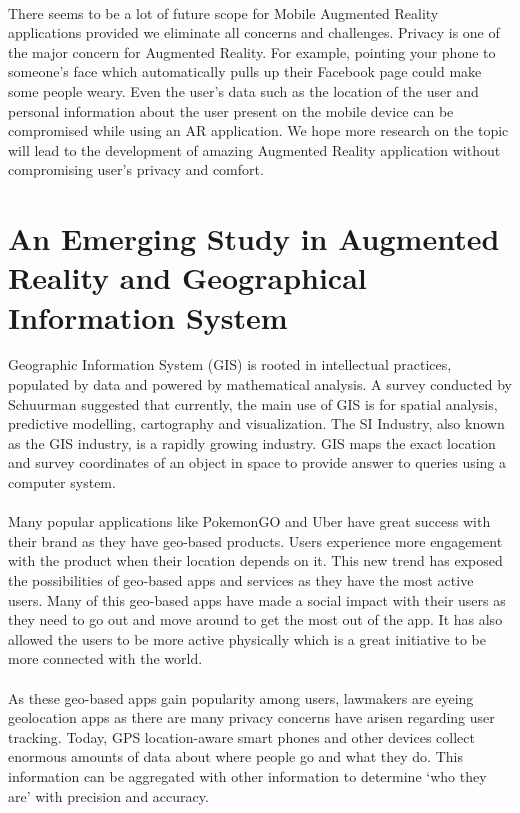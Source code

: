 \paragraph{} 
    There seems to be a lot of future scope for Mobile Augmented Reality applications 
provided we eliminate all concerns and challenges. Privacy is one of the major concern 
for Augmented Reality. For example, pointing your phone to someone’s face which 
automatically pulls up their Facebook page could make some people weary. Even the 
user’s data such as the location of the user and personal information about the user 
present on the mobile device can be compromised while using an AR application. We 
hope more research on the topic will lead to the development of amazing Augmented 
Reality application without compromising user’s privacy and comfort. 
\section{An Emerging Study in Augmented Reality and Geographical Information System}
Geographic Information System (GIS) is rooted in intellectual practices, populated by data and powered by mathematical analysis. A survey conducted by Schuurman suggested that currently, the main use of GIS is for spatial analysis, predictive modelling, cartography and visualization. The SI Industry, also known as the GIS industry, is a rapidly growing industry. GIS maps the exact location and survey coordinates of an object in space to provide answer to queries using a computer system.
\paragraph{} Many popular applications like PokemonGO and Uber have great success with their brand as they have geo-based products. Users experience more engagement with the product when their location depends on it. This new trend has exposed the possibilities of geo-based apps and services as they have the most active users. Many of this geo-based apps have made a social impact with their users as they need to go out and move around to get the most out of the app. It has also allowed the users to be more active physically which is a great initiative to be more connected with the world.
\paragraph{} As these geo-based apps gain popularity among users, lawmakers are eyeing geolocation apps as there are many privacy concerns have arisen regarding user tracking. Today, GPS location-aware smart phones and other devices collect enormous amounts of data about where people go and what they do. This information can be aggregated with other information to determine ‘who they are’ with precision and accuracy.

